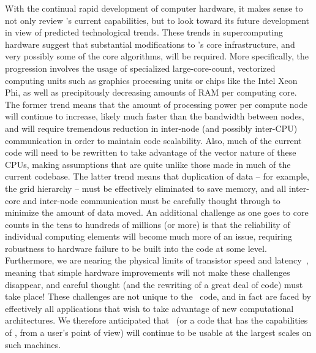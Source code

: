 With the continual rapid development of computer hardware, it makes
sense to not only review \enzo's current capabilities, but to look
toward its future development in view of predicted technological
trends. These trends in supercomputing hardware suggest that
substantial modifications to \enzo's core infrastructure, and very
possibly some of the core algorithms, will be required. More
specifically, the progression involves the usage of specialized
large-core-count, vectorized computing units such as graphics
processing units or chips like the Intel Xeon Phi, as well as
precipitously decreasing amounts of RAM per computing core.  The
former trend means that the amount of processing power per compute
node will continue to increase, likely much faster than the bandwidth
between nodes, and will require tremendous reduction in inter-node
(and possibly inter-CPU) communication in order to maintain code
scalability.  Also, much of the current code will need to be rewritten
to take advantage of the vector nature of these CPUs, making
assumptions that are quite unlike those made in much of the current
codebase.  The latter trend means that duplication of data -- for
example, the grid hierarchy -- must be effectively eliminated to save
memory, and all inter-core and inter-node communication must be
carefully thought through to minimize the amount of data moved.  An
additional challenge as one goes to core counts in the tens to
hundreds of millions (or more) is that the reliability of individual
computing elements will become much more of an issue, requiring
robustness to hardware failure to be built into the code at some
level.  Furthermore, we are nearing the physical limits of transistor
speed and latency~\citep{feynman1999feynman}, meaning that simple
hardware improvements will not make these challenges disappear, and
careful thought (and the rewriting of a great deal of code) must take
place!  These challenges are not unique to the \enzo\ code, and in
fact are faced by effectively all applications that wish to take
advantage of new computational architectures. We therefore anticipated
that \enzo\ (or a code that has the capabilities of \enzo, from a
user's point of view) will continue to be usable at the
largest scales on such machines.

